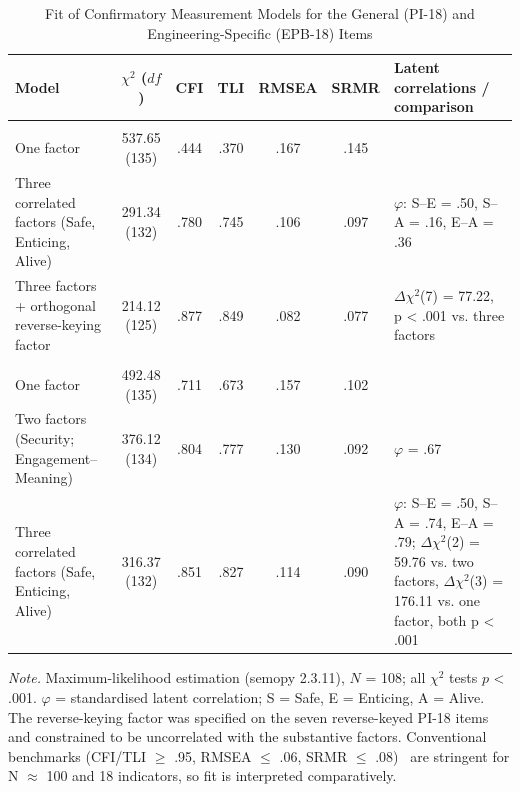 \documentclass[journal,a4paper]{IEEEtran}
\begin{document}
\begin{table}[tp]
\centering
\renewcommand{\arraystretch}{1.12}
\footnotesize
\caption{Fit of Confirmatory Measurement Models for the General (PI-18) and Engineering-Specific (EPB-18) Items}
\label{tab:t2}
\begin{tabular}{>{\raggedright\arraybackslash}p{5.8cm}ccccc>{\raggedright\arraybackslash}p{5.0cm}}
\toprule
\textbf{Model} & $\chi ^2$ ($df$) & CFI & TLI & RMSEA & SRMR & Latent correlations / comparison \\
\midrule
\multicolumn{7}{l}{\emph{PI-18 (general primals)}} \\
\hspace{0.8em}One factor & 537.65 (135) & .444 & .370 & .167 & .145 &  \\
\hspace{0.8em}Three correlated factors (Safe, Enticing, Alive) & 291.34 (132) & .780 & .745 & .106 & .097 & $\varphi$: S–E = .50, S–A = .16, E–A = .36 \\
\hspace{0.8em}Three factors + orthogonal reverse-keying factor & 214.12 (125) & .877 & .849 & .082 & .077 & $\Delta \chi ^2$(7) = 77.22, p < .001 vs. three factors \\
\multicolumn{7}{l}{\emph{EPB-18 (engineering-specific)}} \\
\hspace{0.8em}One factor & 492.48 (135) & .711 & .673 & .157 & .102 &  \\
\hspace{0.8em}Two factors (Security; Engagement–Meaning) & 376.12 (134) & .804 & .777 & .130 & .092 & $\varphi$ = .67 \\
\hspace{0.8em}Three correlated factors (Safe, Enticing, Alive) & 316.37 (132) & .851 & .827 & .114 & .090 & $\varphi$: S–E = .50, S–A = .74, E–A = .79; $\Delta \chi ^2$(2) = 59.76 vs. two factors, $\Delta \chi ^2$(3) = 176.11 vs. one factor, both p < .001 \\
\bottomrule
\end{tabular}

\vspace{2pt}\parbox{\textwidth}{\scriptsize \emph{Note.} Maximum-likelihood estimation (semopy 2.3.11), $N$ = 108; all $\chi ^2$ tests $p$ < .001. $\varphi$ = standardised latent correlation; S = Safe, E = Enticing, A = Alive. The reverse-keying factor was specified on the seven reverse-keyed PI-18 items and constrained to be uncorrelated with the substantive factors. Conventional benchmarks (CFI/TLI $\ge$ .95, RMSEA $\le$ .06, SRMR $\le$ .08)~\cite{hu1999} are stringent for N $\approx$ 100 and 18 indicators, so fit is interpreted comparatively.}
\end{table}
\end{document}
